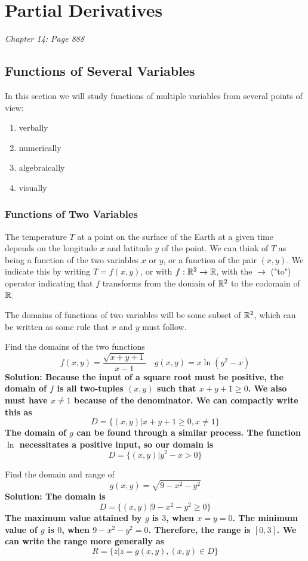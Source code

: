 \section{Partial Derivatives}
\textit{Chapter 14: Page 888}
\subsection{Functions of Several Variables}
In this section we will study functions of multiple variables from several points of view:
\begin{enumerate}
    \item verbally 
    \item numerically
    \item algebraically
    \item visually
\end{enumerate}
\subsubsection{Functions of Two Variables}
The temperature \(T\) at a point on the surface of the Earth at a given time depends on the longitude \(x\) and latitude \(y\) of the point. We can think of \(T\) as being a function of the two variables \(x\) or \(y\), or a function of the pair \((x,y)\). We indicate this by writing \(T = f(x, y)\), or with \(f: \mathbb{R}^2\to \mathbb{R}\), with the \(\to\) ("to") operator indicating that \(f\) transforms from the domain of \(\mathbb{R}^2\) to the codomain of \(\mathbb{R}\).\par
The domains of functions of two variables will be some subset of \(\mathbb{R}^2\), which can be written as some rule that \(x\) and \(y\) must follow. 
\begin{example}
    Find the domains of the two functions 
    \[ f(x,y) = \frac{\sqrt{x+y+1}}{x-1}\quad g(x,y) = x\ln(y^2-x) \]
    \bf{Solution: }Because the input of a square root must be positive, the domain of \(f\) is all two-tuples \((x,y)\) such that \(x+y+1\geq 0\). We also must have \(x\neq 1\) because of the denominator. We can compactly write this as 
    \[ D = \{(x,y)|x+y+1\geq 0, x\neq 1\}\]
    The domain of \(g\) can be found through a similar process. The function \(\ln\) necessitates a positive input, so our domain is 
    \[ D = \{(x,y)|y^2-x>0\}\]
\end{example}
\begin{example}
    Find the domain and range of \[ g(x, y) = \sqrt{9-x^2-y^2} \]
    \bf{Solution: }The domain is 
    \[ D = \{(x, y)|9-x^2-y^2\geq 0\}\]
    The maximum value attained by \(g\) is \(3\), when \(x=y=0\). The minimum value of \(g\) is \(0\), when \(9-x^2-y^2=0\). Therefore, the range is \([0, 3]\). We can write the range more generally as 
    \[ R = \{z|z=g(x,y), (x,y)\in D\}\]
\end{example}
